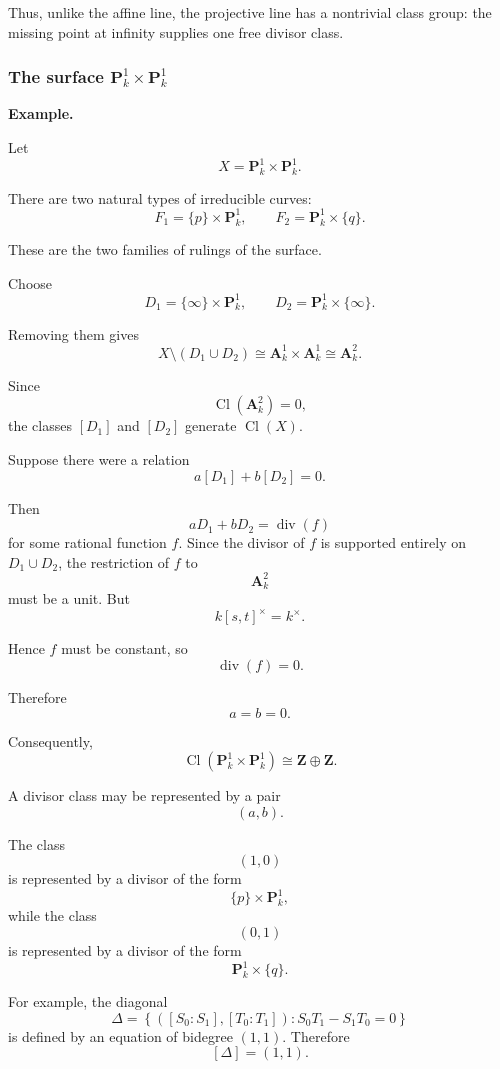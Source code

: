 Thus, unlike the affine line, the projective line has a nontrivial class group: the missing point at infinity supplies one free divisor class.

\subsubsection{\texorpdfstring{The surface \(\mathbf P^1_k\times\mathbf P^1_k\)}{The surface P1 times P1}}

\textbf{Example.}

Let
\[
X=\mathbf P^1_k\times\mathbf P^1_k.
\]

There are two natural types of irreducible curves:
\[
F_1=\{p\}\times\mathbf P^1_k,
\qquad
F_2=\mathbf P^1_k\times\{q\}.
\]

These are the two families of rulings of the surface.

Choose
\[
D_1=\{\infty\}\times\mathbf P^1_k,
\qquad
D_2=\mathbf P^1_k\times\{\infty\}.
\]

Removing them gives
\[
X\setminus(D_1\cup D_2)
\cong
\mathbf A^1_k\times\mathbf A^1_k
\cong
\mathbf A^2_k.
\]

Since
\[
\operatorname{Cl}(\mathbf A^2_k)=0,
\]
the classes \([D_1]\) and \([D_2]\) generate \(\operatorname{Cl}(X)\).

Suppose there were a relation
\[
a[D_1]+b[D_2]=0.
\]

Then
\[
aD_1+bD_2=\operatorname{div}(f)
\]
for some rational function \(f\). Since the divisor of \(f\) is supported entirely on \(D_1\cup D_2\), the restriction of \(f\) to
\[
\mathbf A^2_k
\]
must be a unit. But
\[
k[s,t]^\times=k^\times.
\]

Hence \(f\) must be constant, so
\[
\operatorname{div}(f)=0.
\]

Therefore
\[
a=b=0.
\]

Consequently,
\[
\boxed{
	\operatorname{Cl}(\mathbf P^1_k\times\mathbf P^1_k)
	\cong
	\mathbf Z\oplus\mathbf Z.
}
\]

A divisor class may be represented by a pair
\[
(a,b).
\]

The class
\[
(1,0)
\]
is represented by a divisor of the form
\[
\{p\}\times\mathbf P^1_k,
\]
while the class
\[
(0,1)
\]
is represented by a divisor of the form
\[
\mathbf P^1_k\times\{q\}.
\]

For example, the diagonal
\[
\Delta
=
\left\{
([S_0:S_1],[T_0:T_1])
:
S_0T_1-S_1T_0=0
\right\}
\]
is defined by an equation of bidegree \((1,1)\). Therefore
\[
[\Delta]=(1,1).
\]


